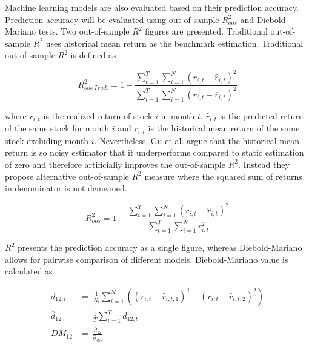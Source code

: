\documentclass{article}
\begin{document}
Machine learning models are also evaluated based on their prediction accuracy. Prediction accuracy will be evaluated using out-of-sample $R^{2}_{oos}$ and Diebold-Mariano tests. Two out-of-sample $R^{2}$ figures are presented. Traditional out-of-sample $R^{2}$ uses historical mean  return as the benchmark estimation. Traditional out-of-sample $R^{2}$ is defined as \par

\begin{equation}
\label{eq:r2Trad}
R^{2}_{oos \ Trad.} = 1 - \frac{\sum^T_{t=1} \sum^N_{i=1} (r_{i, t} - \hat r_{i, t})^2}{ \sum^T_{t=1} \sum^N_{i=1} (r_{i, t} - \overline{r}_{i, t} )^2}
\end{equation}

where $r_{i, t}$ is the realized return of stock $i$ in month $t$, $\hat r_{i, t}$ is the predicted return of the same stock for month $i$ and $\overline{r}_{i, t}$ is the historical mean return of the same stock excluding month $i$. Nevertheless, Gu et al. \citeyear{guetal} argue that the historical mean return is so noisy estimator that it underperforms compared to static estimation of zero and therefore artificially improves the out-of-sample $R^{2}$. Instead they propose alternative out-of-sample $R^{2}$ measure where the squared sum of returns in denominator is not demeaned. \par

\begin{equation}
\label{eq:r2}
R^{2}_{oos} = 1 - \frac{\sum^T_{t=1} \sum^N_{i=1} (r_{i, t} - \hat r_{i, t})^2}{ \sum^T_{t=1} \sum^N_{i=1} r^2_{i, t}}
\end{equation}

$R^2$ presents the prediction accuracy as a single figure, whereas Diebold-Mariano allows for pairwise comparison of different models. Diebold-Mariano value is calculated as \par

\begin{equation}
\label{eq:Diebold-Mariano}
\begin{split}
 d_{12, t} 			& = \ \frac{1}{N_{t}}  \sum^N_{i=1}((r_{i, t} - \hat r_{i, t, 1})^2 - (r_{i, t} - \hat r_{i, t, 2})^2) \\
\overline{d}_{12} 	& = \ \frac{1}{T} \sum^T_{t=1} d_{12, t} \\
DM_{12} 			& = \ \frac{\overline{d}_{12}}{\hat \sigma_{d_{12}}} \\
\end{split}
\end{equation}
\end{document}

